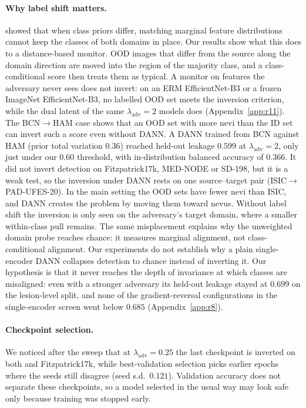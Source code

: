 \documentclass{midl}
\newcommand{\lam}{\lambda_{\mathrm{adv}}}
\begin{document}
\paragraph{Why label shift matters.}
\citet{zhao2019invariant} showed that when class priors differ, matching marginal feature
distributions cannot keep the classes of both domains in place. Our results show what this does
to a distance-based monitor. OOD images that differ from the source along the domain
direction are moved into the region of the majority class, and a class-conditional score
then treats them as typical. A monitor on features the adversary never sees does not invert:
on an ERM EfficientNet-B3 or a frozen ImageNet EfficientNet-B3, no labelled OOD set meets the
inversion criterion, while the dual latent of the same $\lam=2$ models does (Appendix~\ref{app:r11}).
The BCN$\to$HAM case shows that an OOD set with more nevi than
the ID set can invert such a score even without DANN. A DANN trained from BCN against HAM
(prior total variation $0.36$) reached held-out leakage $0.599$ at $\lam=2$, only just under our $0.60$ threshold,
with in-distribution balanced accuracy of $0.366$. It did not invert
detection on Fitzpatrick17k, MED-NODE or SD-198, but it is a weak test, so the inversion under DANN rests on one
source--target pair (ISIC$\to$PAD-UFES-20). In the main setting the OOD sets have
fewer nevi than ISIC, and DANN creates the problem by moving them toward nevus. Without label
shift the inversion is only seen on the adversary's target domain, where a smaller
within-class pull remains. The same misplacement explains why the unweighted domain probe reaches
chance: it measures marginal alignment, not class-conditional alignment. Our
experiments do not establish why a plain single-encoder DANN collapses detection to chance
instead of inverting it. Our hypothesis is that it never reaches the depth of invariance at
which classes are misaligned: even with a stronger adversary its held-out leakage stayed at
$0.699$ on the lesion-level split, and none of the gradient-reversal configurations in the
single-encoder screen went below $0.685$ (Appendix~\ref{app:r8}).

\paragraph{Checkpoint selection.}\label{sec:discussion-ckpt}
We noticed after the sweep that at $\lam=0.25$ the last checkpoint is inverted on both
\texttt{} and Fitzpatrick17k, while best-validation selection picks earlier
epochs where the seeds still disagree (seed s.d.\ $0.121$). Validation accuracy does not
separate these checkpoints, so a model selected in the usual way may look safe only because
training was stopped early.
\end{document}
